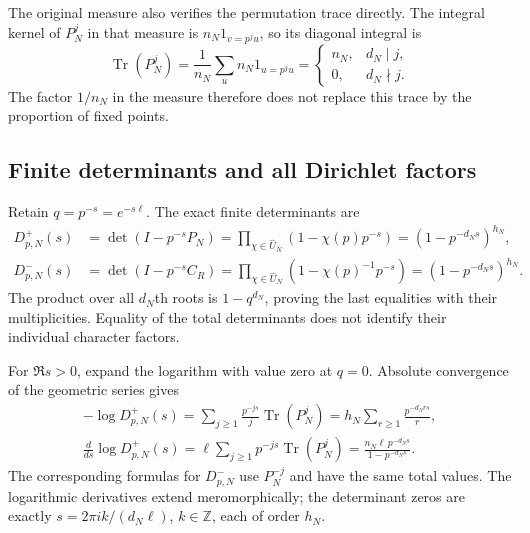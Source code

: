 The original measure also verifies the permutation trace directly.
The integral kernel of $P_N^j$ in that measure is
$n_N1_{v=p^ju}$, so its diagonal integral is
\begin{equation}\tag{PHS10}
 \operatorname{Tr}(P_N^j)=
 \frac1{n_N}\sum_u n_N1_{u=p^ju}
 =\begin{cases}n_N,&d_N\mid j,\\0,&d_N\nmid j.\end{cases}
\end{equation}
The factor $1/n_N$ in the measure therefore does not replace this
trace by the proportion of fixed points.

\subsection{Finite determinants and all Dirichlet factors}

Retain $q=p^{-s}=e^{-s\ell}$. The exact finite determinants are
\begin{equation}\tag{PHS11}
 \begin{split}
 D_{p,N}^{+}(s)&=\det(I-p^{-s}P_N)
       =\prod_{\chi\in\widehat U_N}(1-\chi(p)p^{-s})
       =(1-p^{-d_Ns})^{h_N},\\
 D_{p,N}^{-}(s)&=\det(I-p^{-s}C_R)
       =\prod_{\chi\in\widehat U_N}(1-\chi(p)^{-1}p^{-s})
       =(1-p^{-d_Ns})^{h_N}.
 \end{split}
\end{equation}
The product over all $d_N$th roots is $1-q^{d_N}$, proving the
last equalities with their multiplicities. Equality of the total
determinants does not identify their individual character factors.

For $\Re s>0$, expand the logarithm with value zero at $q=0$.
Absolute convergence of the geometric series gives
\begin{equation}\tag{PHS12}
 \begin{gathered}
 -\log D_{p,N}^{+}(s)
       =\sum_{j\ge1}\frac{p^{-js}}j\operatorname{Tr}(P_N^j)
       =h_N\sum_{r\ge1}\frac{p^{-d_Nrs}}r,\\
 \frac{d}{ds}\log D_{p,N}^{+}(s)
       =\ell\sum_{j\ge1}p^{-js}\operatorname{Tr}(P_N^j)
       =\frac{n_N\ell\,p^{-d_Ns}}{1-p^{-d_Ns}}.
 \end{gathered}
\end{equation}
The corresponding formulas for $D^-_{p,N}$ use $P_N^{-j}$
and have the same total values. The logarithmic derivatives extend
meromorphically; the determinant zeros are exactly
$s=2\pi ik/(d_N\ell)$, $k\in\mathbb Z$, each of order $h_N$.


